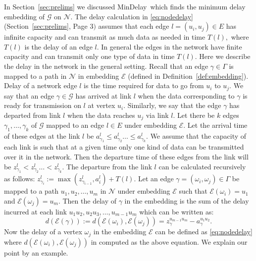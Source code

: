 \documentclass[journal]{IEEEtran}
\newcommand{\net}{\mathcal{N}}
\newcommand{\netedges}{E}
\newcommand{\compgraph}{\mathcal{G}}
\newcommand{\compedges}{\Gamma}
\newcommand{\mindelay}{\textsf{MinDelay}}
\newcommand{\embedding}{\mathcal{E}}
\begin{document}
In Section~\ref{sec:prelims} we discussed \mindelay\ which finds the
minimum delay embedding of $\compgraph$ on $\net.$ The delay
calculation in \eqref{eq:nodedelay} (Section~\ref{sec:prelims}, Page
$3)$ assumes that each edge $l= (u_i,u_j) \in \netedges$ has infinite
capacity and can transmit as much data as needed in time $T(l),$ where
$T(l)$ is the delay of an edge $l.$ In general the edges in the
network have finite capacity and can transmit only one type of data in
time $T(l).$ Here we describe the delay in the network in the general
setting. Recall that an edge $\gamma \in \compedges$ is mapped to a
path in $\net$ in embedding $\embedding$ (defined in
Definition~\ref{def:embedding}). Delay of a network edge $l$ is the
time required for data to go from $u_i$ to $u_j.$ We say that an edge
$\gamma \in \compgraph$ has arrived at link $l$ when the data
corresponding to $\gamma$ is ready for transmission on $l$ at vertex
$u_i.$ Similarly, we say that the edge $\gamma$ has departed from link
$l$ when the data reaches $u_j$ via link $l.$ Let there be $k$ edges
$\gamma_1,\ldots,\gamma_k$ of $\compgraph$ mapped to an edge $l \in
\netedges$ under embedding $\embedding.$ Let the arrival time of these
edges at the link $l$ be $a_{\gamma_1}^l \leq a_{\gamma_2}^l \ldots
\leq a_{\gamma_k}^l.$ We assume that the capacity of each link is such
that at a given time only one kind of data can be transmitted over it
in the network. Then the departure time of these edges from the link
will be $z_{\gamma_1}^l < z_{\gamma_2}^l \ldots < z_{\gamma_k}^l.$ The
departure from the link $l$ can be calculated recursively as follows:
$z_{\gamma_i}^l := \max(z_{\gamma_{i-1}}^l,a_i^l) + T(l).$
Let an edge $\gamma =(\omega_i,\omega_j) \in \compedges$ be mapped to
a path $u_1,u_2,\ldots,u_m$ in $\net$ under embedding $\embedding$
such that $\embedding(\omega_i) = u_1$ and $\embedding(\omega_j) =
u_m.$ Then the delay of $\gamma$ in the embedding is the sum of the
delay incurred at each link $u_1u_2,u_2u_3,\ldots,u_{m-1}u_m$ which
can be written as:
\begin{equation}
  d(\embedding(\gamma)) :=
  d(\embedding(\omega_i),\embedding(\omega_j)) =
  z_{\gamma}^{u_{m-1}u_m} -
  a_{\gamma}^{u_1u_2}. \label{eq:actualdelay}
\end{equation} 
Now the delay of a vertex $\omega_j$ in the embedding $\embedding$ can
be defined as \eqref{eq:nodedelay} where
$d(\embedding(\omega_i),\embedding(\omega_j))$ in computed as the
above equation. We explain our point by an example.
\end{document}
